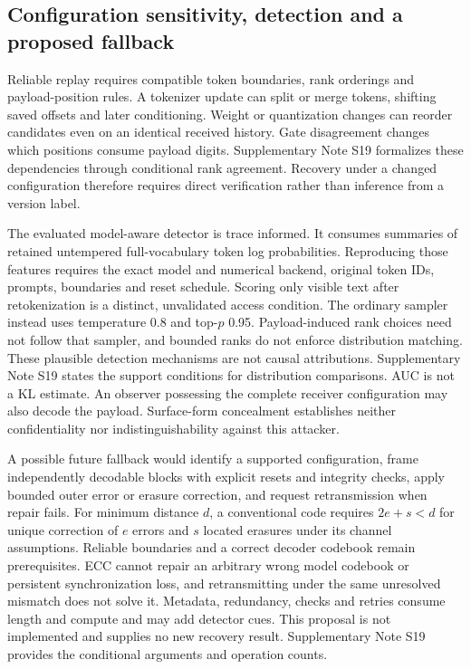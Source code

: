 \subsection*{Configuration sensitivity, detection and a proposed fallback}\label{sec:v4-boundaries}
Reliable replay requires compatible token boundaries, rank orderings and payload-position rules. A tokenizer update can split or merge tokens, shifting saved offsets and later conditioning. Weight or quantization changes can reorder candidates even on an identical received history. Gate disagreement changes which positions consume payload digits. Supplementary Note S19 formalizes these dependencies through conditional rank agreement. Recovery under a changed configuration therefore requires direct verification rather than inference from a version label.

The evaluated model-aware detector is trace informed. It consumes summaries of retained untempered full-vocabulary token log probabilities. Reproducing those features requires the exact model and numerical backend, original token IDs, prompts, boundaries and reset schedule. Scoring only visible text after retokenization is a distinct, unvalidated access condition. The ordinary sampler instead uses temperature 0.8 and top-\(p\) 0.95. Payload-induced rank choices need not follow that sampler, and bounded ranks do not enforce distribution matching. These plausible detection mechanisms are not causal attributions. Supplementary Note S19 states the support conditions for distribution comparisons. AUC is not a KL estimate. An observer possessing the complete receiver configuration may also decode the payload. Surface-form concealment establishes neither confidentiality nor indistinguishability against this attacker.

A possible future fallback would identify a supported configuration, frame independently decodable blocks with explicit resets and integrity checks, apply bounded outer error or erasure correction, and request retransmission when repair fails. For minimum distance \(d\), a conventional code requires \(2e+s<d\) for unique correction of \(e\) errors and \(s\) located erasures under its channel assumptions. Reliable boundaries and a correct decoder codebook remain prerequisites. ECC cannot repair an arbitrary wrong model codebook or persistent synchronization loss, and retransmitting under the same unresolved mismatch does not solve it. Metadata, redundancy, checks and retries consume length and compute and may add detector cues. This proposal is not implemented and supplies no new recovery result. Supplementary Note S19 provides the conditional arguments and operation counts.
